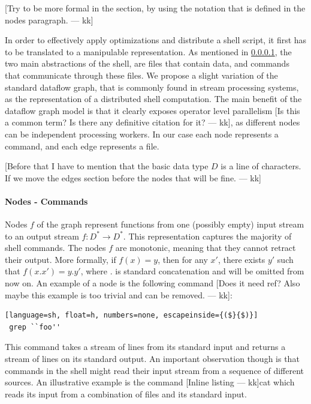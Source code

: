 \documentclass[sigplan,10pt,review,anonymous]{acmart}
\newcommand{\kk}[1]{[{\color{magenta}#1 --- kk}]}
\begin{document}
\kk{Try to be more formal in the section, by using the notation that
  is defined in the nodes paragraph.}

In order to effectively apply optimizations and distribute a shell
script, it first has to be translated to a manipulable
representation. As mentioned in \ref{}, the two main abstractions of
the shell, are files that contain data, and commands that communicate
through these files. We propose a slight variation of the standard
dataflow graph, that is commonly found in stream processing systems,
as the representation of a distributed shell computation. The main
benefit of the dataflow graph model is that it clearly exposes
operator level parallelism \kk{Is this a common term? Is there any
  definitive citation for it?}, as different nodes can be independent
processing workers. In our case each node represents a command, and
each edge represents a file.


\kk{Before that I have to mention that the basic data type $D$ is a
  line of characters. If we move the edges section before the nodes
  that will be fine.}

\paragraph{Nodes - Commands}

Nodes $f$ of the graph represent functions from one (possibly empty)
input stream to an output stream $f : D^* \rightarrow D^*$.  This
representation captures the majority of shell commands. The nodes $f$
are monotonic, meaning that they cannot retract their output. More
formally, if $f(x) = y$, then for any $x'$, there exists $y'$ such
that $f(x.x') = y.y'$, where $.$ is standard concatenation and will be
omitted from now on. An example of a node is the following command
\kk{Does it need ref? Also maybe this example is too trivial and can
  be removed.}:

\begin{lstlisting}[language=sh, float=h, numbers=none, escapeinside={($}{$)}]
 grep ``foo''
\end{lstlisting}

\noindent
This command takes a stream of lines from its standard input and
returns a stream of lines on its standard output. An important
observation though is that commands in the shell might read their
input stream from a sequence of different sources. An illustrative
example is the command \kk{Inline listing}cat which reads its input
from a combination of files and its standard input.
\end{document}
